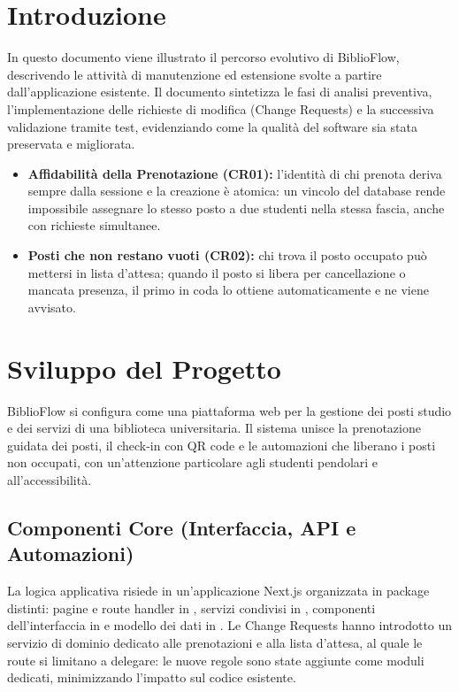 \documentclass[11pt,a4paper,oneside,openany]{book}
\begin{document}
\frontmatter
\copertina
\tableofcontents

\mainmatter
\chapter{Introduzione}

In questo documento viene illustrato il percorso evolutivo di BiblioFlow,
descrivendo le attività di manutenzione ed estensione svolte a partire
dall'applicazione esistente. Il documento sintetizza le fasi di analisi
preventiva, l'implementazione delle richieste di modifica (Change Requests)
e la successiva validazione tramite test, evidenziando come la qualità del
software sia stata preservata e migliorata.
\begin{itemize}
  \item \textbf{Affidabilità della Prenotazione (CR01):} l'identità di chi
        prenota deriva sempre dalla sessione e la creazione è atomica: un
        vincolo del database rende impossibile assegnare lo stesso posto a
        due studenti nella stessa fascia, anche con richieste simultanee.
  \item \textbf{Posti che non restano vuoti (CR02):} chi trova il posto
        occupato può mettersi in lista d'attesa; quando il posto si libera per
        cancellazione o mancata presenza, il primo in coda lo ottiene
        automaticamente e ne viene avvisato.
\end{itemize}

\chapter{Sviluppo del Progetto}

BiblioFlow si configura come una piattaforma web per la gestione dei posti
studio e dei servizi di una biblioteca universitaria. Il sistema unisce la
prenotazione guidata dei posti, il check-in con QR code e le automazioni che
liberano i posti non occupati, con un'attenzione particolare agli studenti
pendolari e all'accessibilità.

\section{Componenti Core (Interfaccia, API e Automazioni)}

La logica applicativa risiede in un'applicazione Next.js organizzata in
package distinti: pagine e route handler in , servizi condivisi
in , componenti dell'interfaccia in  e
modello dei dati in . Le Change Requests hanno introdotto un
servizio di dominio dedicato alle prenotazioni e alla lista d'attesa, al
quale le route si limitano a delegare: le nuove regole sono state aggiunte
come moduli dedicati, minimizzando l'impatto sul codice esistente.
\end{document}
